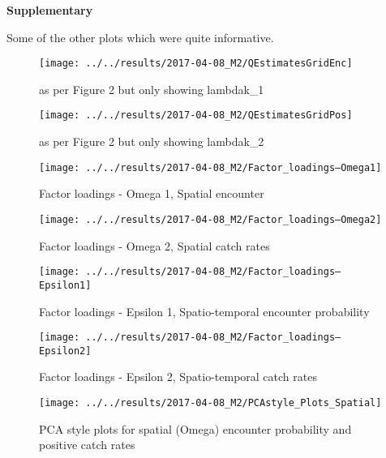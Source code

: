 \documentclass[11pt]{article}
\begin{document}

\newpage

\textbf{Supplementary}

Some of the other plots which were quite informative.

\begin{figure}[!ht]
	\texttt{[image: ../../results/2017-04-08\_M2/QEstimatesGridEnc]}
	\label{fig:Q_square1}
	\caption{as per Figure 2 but only showing lambdak\_1 }
\end{figure}

\begin{figure}[!ht]
	\texttt{[image: ../../results/2017-04-08\_M2/QEstimatesGridPos]}
	\label{fig:Q_square2}
	\caption{as per Figure 2 but only showing lambdak\_2}

\end{figure}


\begin{figure}[!ht]
	\texttt{[image: ../../results/2017-04-08\_M2/Factor\_loadings--Omega1]}
	\label{fig:Fact1}
	\caption{Factor loadings - Omega 1, Spatial encounter}
\end{figure}

\begin{figure}[!ht]
	\texttt{[image: ../../results/2017-04-08\_M2/Factor\_loadings--Omega2]}
	\label{fig:Fact2}
	\caption{Factor loadings - Omega 2, Spatial catch rates}
\end{figure}

\begin{figure}[!ht]
	\texttt{[image: ../../results/2017-04-08\_M2/Factor\_loadings--Epsilon1]}
	\label{fig:Fact3}
	\caption{Factor loadings - Epsilon 1, Spatio-temporal encounter probability}
\end{figure}

\begin{figure}[!ht]
	\texttt{[image: ../../results/2017-04-08\_M2/Factor\_loadings--Epsilon2]}
	\label{fig:Fact4}
	\caption{Factor loadings - Epsilon 2, Spatio-temporal catch rates}
\end{figure}

\begin{figure}[!ht]
	\texttt{[image: ../../results/2017-04-08\_M2/PCAstyle\_Plots\_Spatial]}
	\label{fig:PCA1}
	\caption{PCA style plots for spatial (Omega) encounter probability and positive catch rates}
\end{figure}
\end{document}
